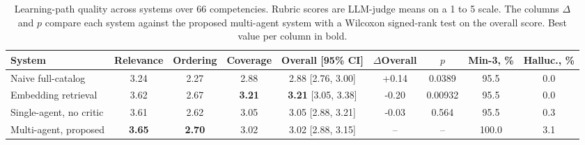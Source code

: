 \begin{table}[t]
\centering
\caption{Learning-path quality across systems over 66 competencies. Rubric scores are LLM-judge means on a 1 to 5 scale. The columns $\Delta$ and $p$ compare each system against the proposed multi-agent system with a Wilcoxon signed-rank test on the overall score. Best value per column in bold.}
\label{tab:main}
\begin{tabular}{lcccccccc}
\hline
System & Relevance & Ordering & Coverage & Overall [95\% CI] & $\Delta$Overall & $p$ & Min-3, \% & Halluc., \% \\
\hline
Naive full-catalog & 3.24 & 2.27 & 2.88 & 2.88 [2.76, 3.00] & +0.14 & 0.0389 & 95.5 & 0.0 \\
Embedding retrieval & 3.62 & 2.67 & \textbf{3.21} & \textbf{3.21} [3.05, 3.38] & -0.20 & 0.00932 & 95.5 & 0.0 \\
Single-agent, no critic & 3.61 & 2.62 & 3.05 & 3.05 [2.88, 3.21] & -0.03 & 0.564 & 95.5 & 0.3 \\
Multi-agent, proposed & \textbf{3.65} & \textbf{2.70} & 3.02 & 3.02 [2.88, 3.15] & -- & -- & 100.0 & 3.1 \\
\hline
\end{tabular}
\end{table}